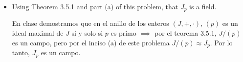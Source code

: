 \begin{problema}[Problema 3]
\begin{itemize}
\begin{dem}
\begin{itemize}
\begin{itemize}
\begin{enumerate}
                            \end{enumerate}
                            Por lo tanto, $\phi$ es un homomorfismo para la suma y la multiplicación.
                        \end{itemize}
                        \item Ahora bien, demostraremos que también se cumple la inyectividad. Se a
                        \begin{align*}
                            \phi((p)+n_1) &= \phi((p)+n_2)\\
                            n_1&\equiv n_2 \mod p\\
                            n_1-n_2&\equiv 0 \mod p\\
                            n_1-n_2&= kp \quad k\in \mathbb{Z}
                            \intertext{De esto, tenemos que $n_1-n_2\in (p)$, lo que nos permite concluir que:}
                            \phi((p)+n_1) &= \phi((p)+n_2)
                        \end{align*}
            \end{itemize}
            Por lo tanto, se cumple una de las definición de isomorfismo para $J/(p)$ y $J_p$
        \end{dem}
        \item Using Theorem 3.5.1 and part (a) of this problem, that $J_{p}$ is a field.
        \begin{dem}
            En clase demostramos que en el anillo de los enteros $(J,+,\cdot)$, $(p)$ es un ideal maximal de $J$ si y solo si $p$ es primo $\implies$ por el teorema 3.5.1, $J/(p)$ es un campo, pero por el inciso (a) de este problema $J/(p)\approx J_p$. Por lo tanto, $J_p$ es un campo. 
        \end{dem}
    \end{itemize}

\end{problema}

%
%

